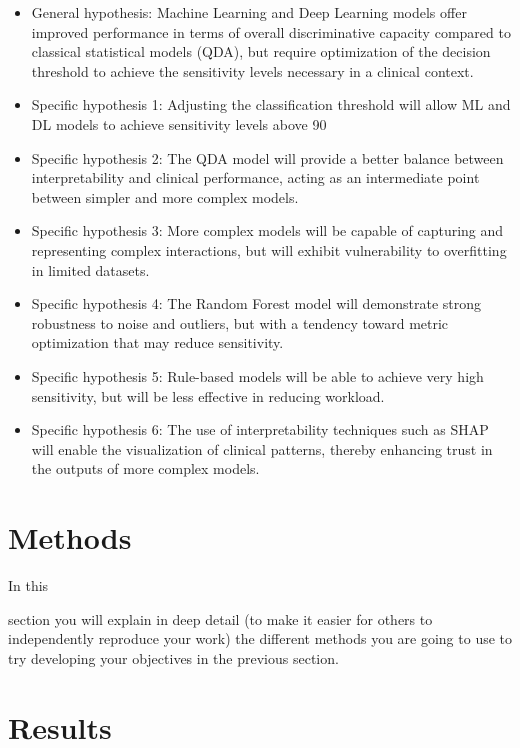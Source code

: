 \documentclass[12pt,onecolumn]{article}
\begin{document}
\begin{itemize}
    \item General hypothesis: Machine Learning and Deep Learning models offer improved performance in terms of overall discriminative capacity compared to classical statistical models (QDA), but require optimization of the decision threshold to achieve the sensitivity levels necessary in a clinical context.
    \item Specific hypothesis 1: Adjusting the classification threshold will allow ML and DL models to achieve sensitivity levels above 90%
    \item Specific hypothesis 2: The QDA model will provide a better balance between interpretability and clinical performance, acting as an intermediate point between simpler and more complex models.
    \item Specific hypothesis 3: More complex models will be capable of capturing and representing complex interactions, but will exhibit vulnerability to overfitting in limited datasets.
    \item Specific hypothesis 4: The Random Forest model will demonstrate strong robustness to noise and outliers, but with a tendency toward metric optimization that may reduce sensitivity.
    \item Specific hypothesis 5: Rule-based models will be able to achieve very high sensitivity, but will be less effective in reducing workload.
    \item Specific hypothesis 6: The use of interpretability techniques such as SHAP will enable the visualization of clinical patterns, thereby enhancing trust in the outputs of more complex models.
\end{itemize}




\newpage
\section{Methods}

In this


section you will explain in deep detail (to make it easier for others to independently reproduce your work) the different methods you are going to use to try developing your objectives in the previous section.


\clearpage
\section{Results}
\end{document}
